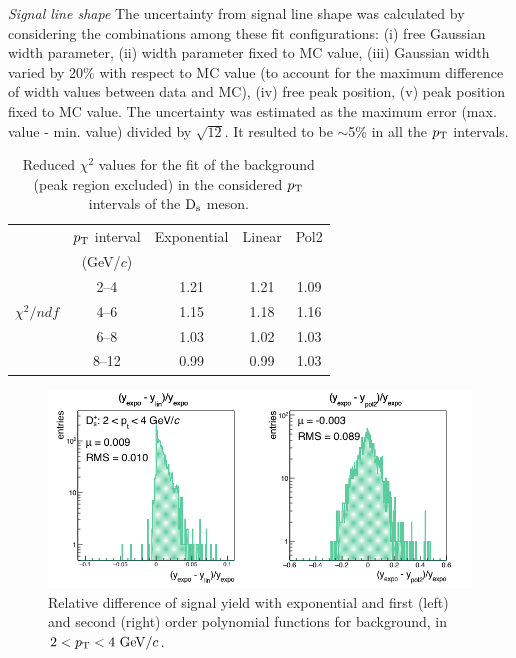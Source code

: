 \emph{Signal line shape}
The uncertainty from signal line shape was calculated by 
considering the combinations among these fit
configurations: (i) free Gaussian width parameter, (ii) width parameter 
fixed to MC value, (iii) Gaussian width varied by 20\% with 
respect to MC value (to account for the maximum difference of width values between data and MC), 
(iv) free peak position, (v) peak position fixed to MC value.
The uncertainty was estimated as the maximum error (max. value - min. value) divided by $\sqrt{12}$.
It resulted to be $\sim$5\% in all the $p_{\rm T}$ intervals. 
\begin{table}[!t]
\centering
\vspace{0.5cm}
\begin{tabular}{|c|c|c|c|c|} 
\hline \rule{0pt}{2.7ex}
 & $p_{\rm T}$ interval & Exponential & Linear & Pol2 \\ 
 &(GeV/$c$) & & &  \\ 
\hline \rule{0pt}{2.7ex}
           &\phantom{0}2--4\phantom{0} & 1.21 & 1.21 & 1.09\\
           $\chi^2/ndf$ &\phantom{0}4--6\phantom{0} & 1.15 & 1.18 & 1.16\\
          &\phantom{0}6--8\phantom{0} & 1.03 & 1.02 & 1.03\\
           &\phantom{0}8--12 & 0.99 & 0.99  & 1.03\\
\hline
\end{tabular}
\caption{Reduced $\chi^2$ values for the fit of the background (peak region excluded) in the
considered $p_{\rm T}$ intervals of the ${\rm D_s}$ meson.} 
\label{tab:chi2bkg}
\end{table}

\begin{figure}[!hb]
\begin{center}
 \includegraphics[width=.70\textwidth]{FigCap4/studyBkg_Free_pt0.png}
\caption{Relative difference of signal yield with exponential and first (left) and second (right) 
order polynomial functions for background, in $2 < p_{\rm T} < 4 ~\mathrm{GeV}/c$.}             
\label{fig:diffBkgPt0}
\end{center}
\end{figure}


